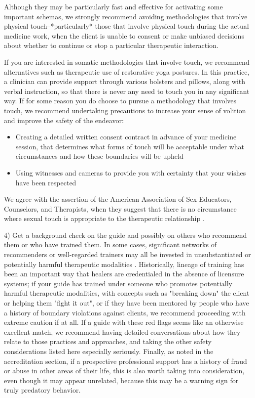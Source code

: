 \documentclass[12pt,letterpaper]{book}
\begin{document}
Although they may be particularly fast and effective for activating some important schemas, we strongly recommend avoiding methodologies that involve physical touch--*particularly* those that involve physical touch during the actual medicine work, when the client is unable to consent or make unbiased decisions about whether to continue or stop a particular therapeutic interaction.

If you are interested in somatic methodologies that involve touch, we recommend alternatives such as therapeutic use of restorative yoga postures. In this practice, a clinician can provide support through various bolsters and pillows, along with verbal instruction, so that there is never any need to touch you in any significant way. If for some reason you do choose to pursue a methodology that involves touch, we recommend undertaking precautions to increase your sense of volition and improve the safety of the endeavor:
\begin{itemize}
    \item Creating a detailed written consent contract in advance of your medicine session, that determines what forms of touch will be acceptable under what circumstances and how these boundaries will be upheld
    \item Using witnesses and cameras to provide you with certainty that your wishes have been respected
\end{itemize}
We agree with the assertion of the American Association of Sex Educators, Counselors, and Therapists, when they suggest that there is no circumstance where sexual touch is appropriate to the therapeutic relationship \cite{aasectTouch}. 

4) Get a background check on the guide and possibly on others who recommend them or who have trained them. In some cases, significant networks of recommenders or well-regarded trainers may all be invested in unsubstantiated or potentially harmful therapeutic modalities \cite{powerTrip}. Historically, lineage of training has been an important way that healers are credentialed in the absence of licensure systems; if your guide has trained under someone who promotes potentially harmful therapeutic modalities, with concepts such as "breaking down" the client or helping them "fight it out", or if they have been mentored by people who have a history of boundary violations against clients, we recommend proceeding with extreme caution if at all. If a guide with these red flags seems like an otherwise excellent match, we recommend having detailed conversations about how they relate to those practices and approaches, and taking the other safety considerations listed here especially seriously. Finally, as noted in the accreditation section, if a prospective professional support has a history of fraud or abuse in other areas of their life, this is also worth taking into consideration, even though it may appear unrelated, because this may be a warning sign for truly predatory behavior.  
\end{document}

